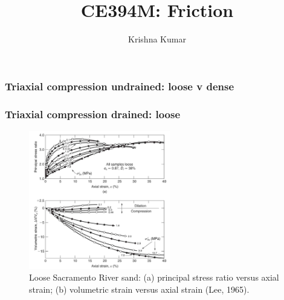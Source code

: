 \documentclass[notes]{beamer}
\title[CE394M: Friction]{CE394M: Friction}
\author{Krishna Kumar} %
\institute[UT Austin] %
{
University of Texas at Austin \\
\medskip
\textit{
  \url{krishnak@utexas.edu}} %
}
\date{} %
\begin{document}
\begin{frame}
\titlepage %
\end{frame}


\begin{frame}
	\frametitle{Triaxial compression undrained: loose v dense}
\end{frame}

\begin{frame}
	\frametitle{Triaxial compression drained: loose}
	\begin{figure}
		\includegraphics[width=0.55\textwidth]{figs/tx-drained-loose.png}
		\caption*{Loose Sacramento River sand: (a) principal stress ratio versus
			axial strain; (b) volumetric strain versus axial strain (Lee, 1965).}
	\end{figure}
\end{frame}
\end{document}
